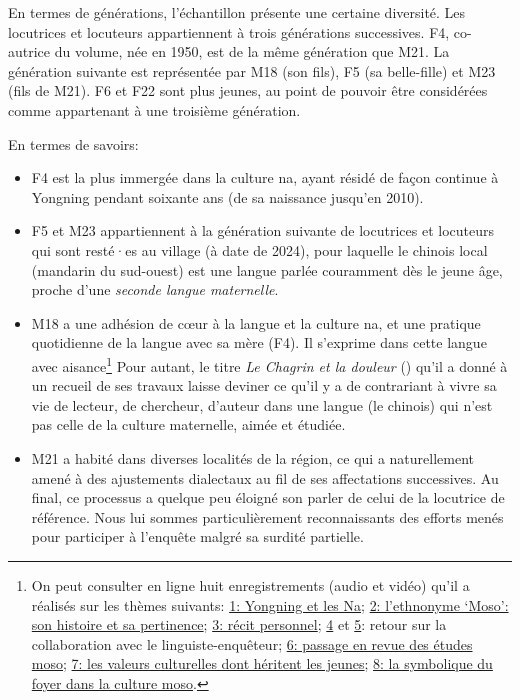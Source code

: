 En termes de générations, l'échantillon présente une certaine diversité. Les locutrices et locuteurs appartiennent à trois générations successives. F4, co-autrice du volume, née en 1950, est de la même génération que M21. La génération suivante est représentée par M18 (son fils), F5 (sa belle-fille) et M23 (fils de M21). F6 et F22 sont plus jeunes, au point de pouvoir être considérées comme appartenant à une troisième génération.

En termes de savoirs:

\begin{itemize}
    \item F4 est la plus immergée dans la culture na, ayant résidé de façon continue à Yongning pendant soixante ans (de sa naissance jusqu'en 2010).
    \item F5 et M23 appartiennent à la génération suivante de locutrices et locuteurs qui sont resté·es au village (à date de 2024), pour laquelle le chinois local (mandarin du sud-ouest) est une langue parlée couramment dès le jeune âge, proche d'une \emph{seconde langue maternelle}.
    \item M18 a une adhésion de cœur à la langue et la culture na, et une pratique quotidienne de la langue avec sa mère (F4). Il s'exprime dans cette langue avec aisance\footnote{On peut consulter en ligne huit enregistrements (audio et vidéo) qu'il a réalisés sur les thèmes suivants:
    \href{https://doi.org/10.24397/pangloss-0007734}{1: Yongning et les Na}; \href{https://doi.org/10.24397/pangloss-0007740}{2: l'ethnonyme ‘Moso’: son histoire et sa pertinence}; \href{https://doi.org/10.24397/pangloss-0007730}{3: récit personnel}; \href{https://doi.org/10.24397/pangloss-0007736}{4} et \href{https://doi.org/10.24397/pangloss-0007738}{5}: retour sur la collaboration avec le linguiste-enquêteur; \href{https://doi.org/10.24397/pangloss-0007742}{6: passage en revue des études moso}; \href{https://doi.org/10.24397/pangloss-0007728}{7: les valeurs culturelles dont héritent les jeunes}; \href{https://doi.org/10.24397/pangloss-0007732}{8: la symbolique du foyer dans la culture moso}.}
    Pour autant, le titre \emph{Le Chagrin et la douleur} () qu'il a donné à un recueil de ses travaux \parencite{latami2016} laisse deviner ce qu'il y a de contrariant à vivre sa vie de lecteur, de chercheur, d'auteur dans une langue (le chinois) qui n'est pas celle de la culture maternelle, aimée et étudiée.
    \item M21 a habité dans diverses localités de la région, ce qui a naturellement amené à des ajustements dialectaux au fil de ses affectations successives. Au final, ce processus a quelque peu éloigné son parler de celui de la locutrice de référence. Nous lui sommes particulièrement reconnaissants des efforts menés pour participer à l'enquête malgré sa surdité partielle.
\end{itemize}
